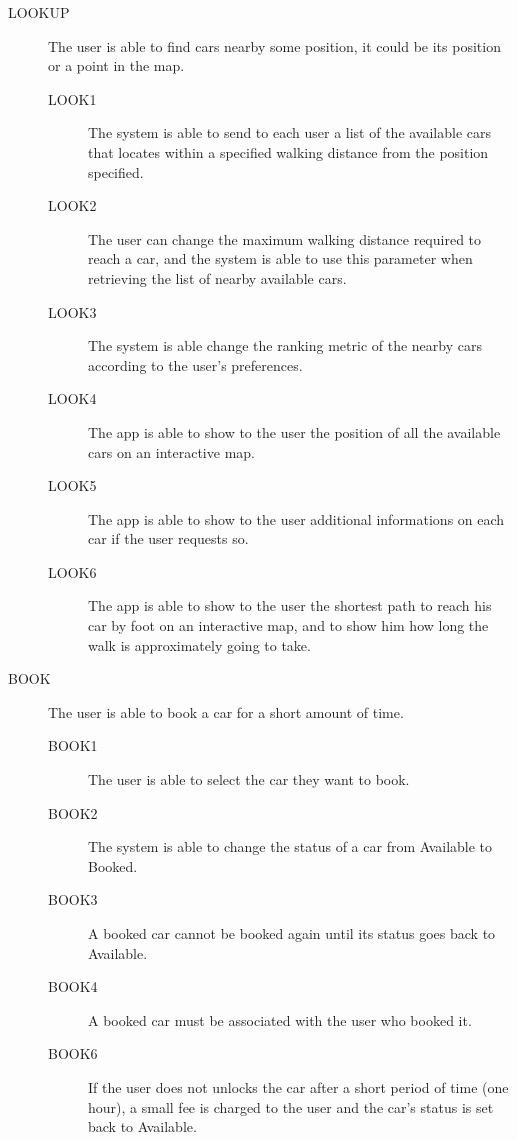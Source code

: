 \documentclass[11pt]{article} %
\begin{document}
\begin{description}
 	\item[LOOKUP] The user is able to find cars nearby some position, it could be its position or a point in the map.
	\begin{description}
	\item[LOOK1] The system is able to send to each user a list of the available cars that locates within a specified walking distance from the position specified.
	\item[LOOK2] The user can change the maximum walking distance required to reach a car, and the system is able to use this parameter when retrieving the list of nearby available cars.
	\item[LOOK3] The system is able change the ranking metric of the nearby cars according to the user's preferences.
	\item[LOOK4] The app is able to show to the user the position of all the available cars on an interactive map.
	\item[LOOK5] The app is able to show to the user additional informations on each car if the user requests so.
	\item[LOOK6] The app is able to show to the user the shortest path to reach his car by foot on an interactive map, and to show him how long the walk is approximately going to take.
	\end{description}

 	\item[BOOK] The user is able to book a car for a short amount of time.
	\begin{description}
	\item[BOOK1] The user is able to select the car they want to book.
	\item[BOOK2] The system is able to change the status of a car from Available to Booked.
	\item[BOOK3] A booked car cannot be booked again until its status goes back to Available.
	\item[BOOK4] A booked car must be associated with the user who booked it.
	\item[BOOK6] If the user does not unlocks the car after a short period of time (one hour), a small fee is charged to the user and the car's status is set back to Available.
	\end{description}


\end{description}
\end{document}

